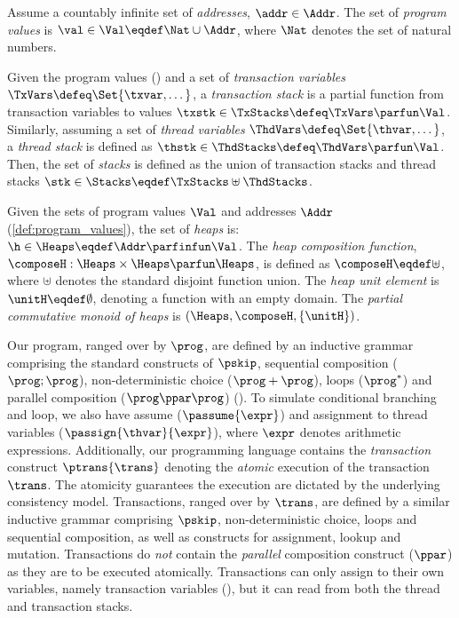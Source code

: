 \begin{defn}
\label{def:program_values}
Assume a countably infinite set of \emph{addresses}, $\addr \in \Addr$. The set of \emph{program values} is $\val \in \Val \eqdef \Nat \cup \Addr$, where $\Nat$ denotes the set of natural numbers.
\end{defn}
 
\begin{defn}[Stacks]
\label{def:stacks}
Given the program values () and a set of \emph{transaction variables} \( \TxVars \defeq \Set{\txvar, \dots}\), a \emph{transaction stack} is a partial function from transaction variables to values \( \txstk \in \TxStacks \defeq \TxVars \parfun \Val \).
Similarly, assuming a set of \emph{thread variables} \( \ThdVars \defeq \Set{\thvar, \dots}\), a \emph{thread stack} is defined as \( \thstk \in \ThdStacks \defeq \ThdVars \parfun \Val \).
Then, the set of \emph{stacks} is defined as the union of transaction stacks and thread stacks \( \stk \in \Stacks \eqdef \TxStacks \uplus \ThdStacks \).
\end{defn}

\begin{definition}[Heaps]
\label{def:heaps}
Given the sets of program values $\Val$  and addresses \( \Addr\)  (\ref{def:program_values}), the set of \emph{heaps} is: $\h \in \Heaps \eqdef \Addr \parfinfun \Val$.
The \emph{heap composition function}, $\composeH: \Heaps \times \Heaps \parfun \Heaps$, is defined as $\composeH \eqdef \uplus$, where $\uplus$ denotes the standard disjoint function union. The \emph{ heap unit element} is $\unitH \eqdef \emptyset$, denoting a function with an empty domain.
The \emph{partial commutative monoid of  heaps} is $(\Heaps, \composeH, \{\unitH\})$.
\end{definition}

Our program, ranged over by $\prog$, are defined by an inductive grammar comprising the standard constructs of $\pskip$, sequential composition ($\prog; \prog$), non-deterministic choice ($\prog+\prog$), loops ($\prog^*$) and  parallel composition ($\prog \ppar \prog$) ().
To simulate conditional branching and loop, we also have assume (\( \passume{\expr}\)) and assignment to thread variables (\( \passign{\thvar}{\expr} \)), where \( \expr \) denotes arithmetic expressions.
Additionally, our programming language contains the \emph{transaction} construct $\ptrans{\trans}$ denoting the \emph{atomic} execution of the transaction $\trans$. 
The atomicity guarantees the execution are dictated by the underlying consistency model.
Transactions, ranged over by $\trans$, are defined by a similar inductive grammar comprising $\pskip$, non-deterministic choice, loops and sequential composition, as well as constructs for assignment, lookup and mutation. 
Transactions do \emph{not} contain the \emph{parallel} composition construct ($\ppar$) as they are to be executed atomically.
Transactions can only assign to their own variables, namely transaction variables (), but it can read from both the thread and transaction stacks.

